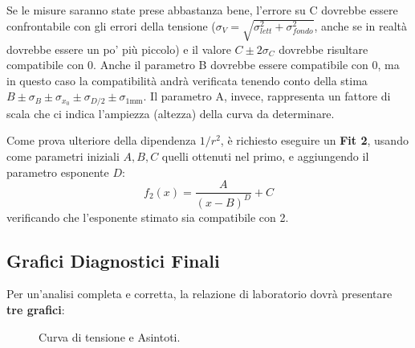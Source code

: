 \documentclass[openany,a4paper,12pt]{book}
\begin{document}
Se le misure saranno state prese abbastanza bene, l'errore su C dovrebbe essere confrontabile con gli errori della tensione ($\sigma_V = \sqrt{\sigma_{lett}^2 + \sigma_{fondo}^2}$, anche se in realtà dovrebbe essere un po' più piccolo) e il valore $C \pm 2\sigma_C$ dovrebbe risultare compatibile con $0$.
Anche il parametro B dovrebbe essere compatibile con $0$, ma in questo caso la compatibilità andrà verificata tenendo conto della stima $B \pm \sigma_{B} \pm \sigma_{x_0} \pm \sigma_{D/2} \pm \sigma_{1\text{mm}}$.
Il parametro A, invece, rappresenta un fattore di scala che ci indica l'ampiezza (altezza) della curva da determinare.

Come prova ulteriore della dipendenza $1/r^2$, è richiesto eseguire un \textbf{Fit 2}, usando come parametri iniziali $A, B, C$ quelli ottenuti nel primo, e aggiungendo il parametro esponente $D$:
\begin{equation}
    f_2(x) = \frac{A}{(x-B)^D} + C
\end{equation}
verificando che l'esponente stimato sia compatibile con 2.


\subsection*{Grafici Diagnostici Finali}
Per un'analisi completa e corretta, la relazione di laboratorio dovrà presentare \textbf{tre grafici}:

\begin{figure}[H]
    \centering
    \caption{Curva di tensione e Asintoti.}
\end{figure}

\vspace{0.5cm}
\end{document}

